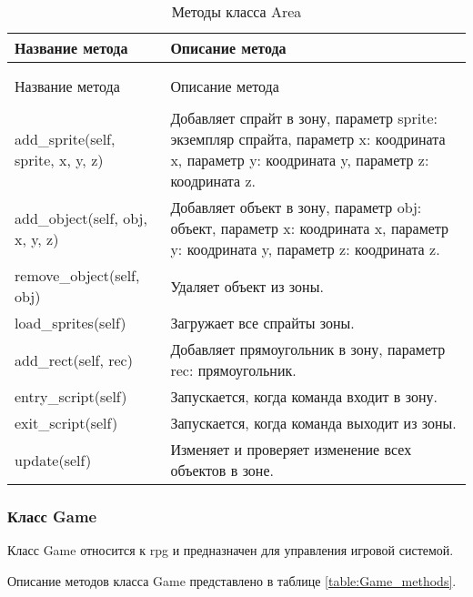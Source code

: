 \begin{xltabular}{\textwidth}{|X|X|}
	\caption{Методы класса Area}\label{table:Area_methods} \\
	\hline \centrow
	Название метода & \centrow  Описание метода \\
	\hline {} &  \\ \hline
	\endfirsthead
	\\
	Название метода & \centrow  Описание метода \\
	\hline {} &  \\ \hline
	\finishhead
	add\_sprite(self, sprite, x, y, z) & Добавляет спрайт в зону, параметр sprite: экземпляр спрайта, параметр x: коодрината x, параметр y: коодрината y, параметр z: коодрината z. \\
	\hline
	add\_object(self, obj, x, y, z) & Добавляет объект в зону, параметр obj: объект, параметр x: коодрината x, параметр y: коодрината y, параметр z: коодрината z. \\
	\hline
	remove\_object(self, obj) & Удаляет объект из зоны. \\
	\hline
	load\_sprites(self) & Загружает все спрайты зоны. \\
	\hline
	add\_rect(self, rec) &  Добавляет прямоугольник в зону, параметр rec: прямоугольник. \\
	\hline
	entry\_script(self) & Запускается, когда команда входит в зону. \\
	\hline
	exit\_script(self) & Запускается, когда команда выходит из зоны. \\
	\hline
	update(self) & Изменяет и проверяет изменение всех объектов в зоне. \\
	\hline
\end{xltabular}

\subsubsection{Класс Game}

Класс Game относится к rpg и предназначен для управления игровой системой.

Описание методов класса Game представлено в таблице \ref{table:Game_methods}.

